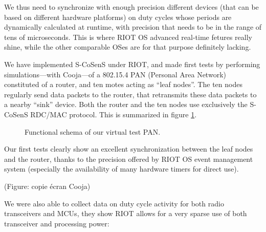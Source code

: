 \documentclass[a4paper,twoside]{article}
\begin{document}
We thus need to synchronize with enough precision different devices (that
can be based on different hardware platforms) on duty cycles whose periods
are dynamically calculated at runtime, with precision that needs to be
in the range of tens of microseconds. This is where RIOT OS advanced
real-time fetures really shine, while the other comparable OSes
are for that purpose definitely lacking.

We have implemented S-CoSenS under RIOT, and made first tests by performing
simulations---with Cooja---of a 802.15.4 PAN (Personal Area Network)
constituted of a router, and ten motes acting as ``leaf nodes''.
The ten nodes regularly send data packets to the router, that retransmits
these data packets to a nearby ``sink'' device. Both the router and the ten
nodes use exclusively the S-CoSenS RDC/MAC protocol. This is summarized
in figure \ref{FigPANtest}.

\begin{figure}[!h]
\centering
{}
\caption{Functional schema of our virtual test PAN.}
\label{FigPANtest}
\end{figure}

Our first tests clearly show an excellent synchronization between the leaf
nodes and the router, thanks to the precision offered by RIOT OS event
management system (especially the availability of many hardware timers
for direct use).

(Figure: copie \'ecran Cooja)

We were also able to collect data on duty cycle activity for both radio
transceivers and MCUs, they show RIOT allows for a very sparse use of
both transceiver and processing power:
\end{document}
